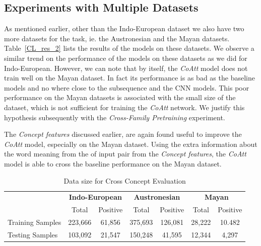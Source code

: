 \documentclass[11pt,letterpaper]{article}
\begin{document}
\subsection{Experiments with Multiple Datasets}

As mentioned earlier, other than the Indo-European dataset we also have two more datasets for the task, ie. the Austronesian and the Mayan datasets. Table~\ref{CL_res_2} lists the results of the models on these datasets. We observe a similar trend on the performance of the models on these datasets as we did for Indo-European. However, we can note that by itself, the \textit{CoAtt} model does not train well on the Mayan dataset. In fact its performance is as bad as the baseline models and no where close to the subsequence and the CNN models. This poor performance on the Mayan datasets is associated with the small size of the dataset, which is not sufficient for training the \textit{CoAtt} network. We justify this hypothesis subsequently with the \textit{Cross-Family Pretraining} experiment.

The \textit{Concept features} discussed earlier, are again found useful to improve the \textit{CoAtt} model, especially on the Mayan dataset. Using the extra information about the word meaning from the of input pair from the \textit{Concept features}, the \textit{CoAtt} model is able to cross the baseline performance on the Mayan dataset. 

\begin{table}[t]
\centering
\begin{tabular}{lcccccc}
\multicolumn{1}{c}{\textbf{}} & \multicolumn{2}{c}{\textbf{Indo-European}} & \multicolumn{2}{c}{\textbf{Austronesian}} & \multicolumn{2}{c}{\textbf{Mayan}} \\
\multicolumn{1}{c}{}          & Total               & Positive             & Total               & Positive            & Total           & Positive         \\
Training Samples              & 223,666             & 61,856               & 375,693             & 126,081             & 28,222          & 10.482           \\
Testing Samples               & 103,092             & 21,547               & 150,248             & 41,595              & 12,344          & 4,297           
\end{tabular}
\caption{Data size for Cross Concept Evaluation}
\label{CC_count}
\end{table}
\end{document}
